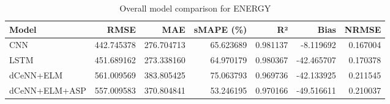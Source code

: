 \begin{table}
\caption{Overall model comparison for ENERGY}
\begin{tabular}{lrrrrrr}
\toprule
Model & RMSE & MAE & sMAPE (\%) & R² & Bias & NRMSE \\
\midrule
CNN & 442.745378 & 276.704713 & 65.623689 & 0.981137 & -8.119692 & 0.167004 \\
LSTM & 451.689162 & 273.338160 & 64.970179 & 0.980367 & -42.465707 & 0.170378 \\
dCeNN+ELM & 561.009569 & 383.805425 & 75.063793 & 0.969736 & -42.133925 & 0.211545 \\
dCeNN+ELM+ASP & 557.009583 & 370.804841 & 53.246195 & 0.970166 & -49.516611 & 0.210037 \\
\bottomrule
\end{tabular}
\end{table}

